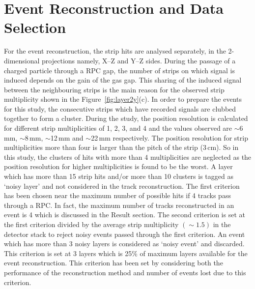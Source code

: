 \section{Event Reconstruction and Data Selection}\label{sec:reconstrction}
For the event reconstruction, the strip hits are
analysed separately, in the 2-dimensional projections namely,
\mbox{X--Z} and \mbox{Y--Z} sides. During the passage of a charged
particle through a RPC gap, the number of strips on which signal is
induced depends on the gain of the gas gap. This sharing of the induced
signal between the neighbouring strips is the main reason for the
observed strip multiplicity shown in the Figure~\ref{fig:layer2y}(c).
In order to prepare the events for this study, the consecutive strips
which have recorded signals are clubbed together to form a cluster.
During the study, the position resolution is calculated for different
strip multiplicities of 1, 2, 3, and 4 and the values observed are
$\sim$6\,mm, $\sim$8\,mm, $\sim$12\,mm and $\sim$22\,mm respectively.
The position resolution for strip multiplicities more than four is
larger than the pitch of the strip (3\,cm). So in this study,
the clusters of hits with more than 4 multiplicities are neglected
as the position resolution for higher multiplicities is found to be
the worst.
A layer which has more than 15 strip hits and/or more than 10 clusters
is tagged as `noisy layer' and not considered in the track
reconstruction. The first criterion has been chosen near the maximum
number of possible hits if 4 tracks pass through a RPC.
In fact, the maximum number of tracks reconstructed in an event is 4
which is discussed in the Result section. The second criterion is set
at the first criterion divided by the average strip multiplicity
$\left(\sim 1.5\right)$ in the detector stack to reject noisy events
passed through the first criterion.
An event which has more than 3 noisy layers is considered as `noisy
event' and discarded. This criterion is set at 3 layers which is 25\%
of maximum layers available for the event reconstruction. This
criterion has been set by considering both the performance of the
reconstruction method and number of events lost due to this criterion.

